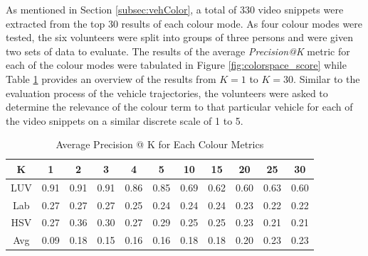 As mentioned in Section \ref{subsec:vehColor}, a total of 330 video snippets were extracted from the top 30 results of each colour mode. As four colour modes were tested, the six volunteers were split into groups of three persons and were given two sets of data to evaluate. The results of the average \textit{Precision@K} metric for each of the colour modes were tabulated in Figure \ref{fig:colorspace_score} while Table \ref{tab:avg@k} provides an overview of the results from $K=1$ to $K=30$. Similar to the evaluation process of the vehicle trajectories, the volunteers were asked to determine the relevance of the colour term to that particular vehicle for each of the video snippets on a similar discrete scale of 1 to 5.
\begin{table}[!tb]
	\centering
	\caption{Average Precision @ K for Each Colour Metrics}
	\label{tab:avg@k}
\begin{tabular}{c||c|c|c|c|c|c|c|c|c|c}
K & 1 & 2 & 3 & 4 & 5 & 10 & 15 & 20 & 25 & 30  \\ \hline \hline
\rowcolor{yellow} LUV  & 0.91 & 0.91 & 0.91 & 0.86 & 0.85 & 0.69 & 0.62 & 0.60 & 0.63 & 0.60 \\
Lab  & 0.27 & 0.27 & 0.27 & 0.25 & 0.24 & 0.24 & 0.24 & 0.23 & 0.22 & 0.22 \\
HSV & 0.27 & 0.36 & 0.30 & 0.27 & 0.29 & 0.25 & 0.25 & 0.23 & 0.21 & 0.21 \\
Avg & 0.09 & 0.18 & 0.15 & 0.16 & 0.16 & 0.18 & 0.18 & 0.20 & 0.23 & 0.23 \\
\end{tabular}
\end{table}
